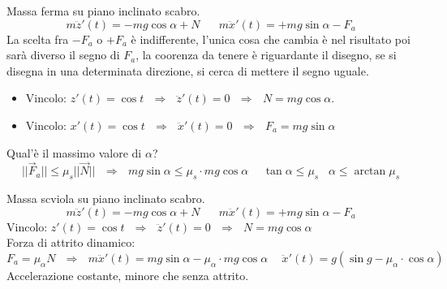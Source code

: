 \begin{example}\label{es-rez-vin-5}
    Massa ferma su piano inclinato scabro.
    $$m\ddot{z}'(t) = -mg\cos\alpha + N \hspace{20pt} m\ddot{x}'(t) = +mg\sin\alpha - F_{a}$$
    La scelta fra $-F_{a}$ o $+F_a$ è indifferente, l'unica cosa che cambia è nel risultato poi sarà diverso il segno di $F_a$, la coorenza da tenere è riguardante il disegno, se si disegna
    in una determinata direzione, si cerca di mettere il segno uguale.
    \begin{itemize}
        \item Vincolo: $z'(t) = \cos t \:\:\:\Rightarrow\:\:\: \ddot{z}'(t) = 0 \:\:\:\Rightarrow\:\:\: N = mg\cos\alpha$.
        \item Vincolo: $x'(t) = \cos t \:\:\:\Rightarrow\:\:\: \ddot{x}'(t) = 0 \:\:\:\Rightarrow\:\:\: F_a = mg\sin\alpha$
    \end{itemize}
    Qual'è il massimo valore di $\alpha$?
    $$||\vec{F}_a|| \leq \mu_s ||\vec{N}|| \:\:\:\Rightarrow\:\:\: mg\sin\alpha \leq \mu_s \cdot mg \cos\alpha \hspace{15pt} \tan\alpha \leq \mu_s \hspace{10pt} \alpha \leq \arctan\mu_s$$
\end{example}

\begin{example}\label{es-rez-vin-6}
    Massa scviola su piano inclinato scabro.
    $$m\ddot{z}'(t) = -mg\cos\alpha + N \hspace{20pt} m\ddot{x}'(t) = +mg\sin\alpha - F_{a}$$
    Vincolo: $z'(t) = \cos t \:\:\:\Rightarrow\:\:\: \ddot{z}'(t) = 0 \:\:\:\Rightarrow\:\:\: N = mg\cos\alpha$\\
    Forza di attrito dinamico: 
    $$F_a = \mu_{\alpha}N \:\:\:\Rightarrow\:\:\: m\ddot{x}'(t) = mg\sin\alpha - \mu_{\alpha} \cdot mg\cos\alpha \hspace{15pt} \ddot{x}'(t) = g(\sin g - \mu_{\alpha} \cdot \cos \alpha)$$
    Accelerazione costante, minore che senza attrito.
\end{example}


